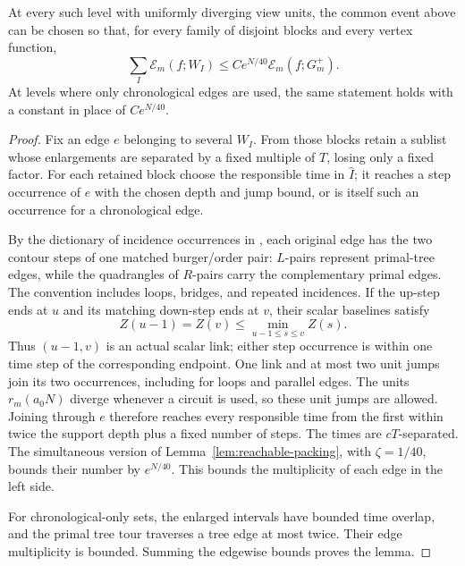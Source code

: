 \begin{lemma}
\label{lem:energy-overlap}
At every such level with uniformly diverging view units, the
common event above can be chosen so that, for every family of
disjoint blocks and every vertex function,
\begin{equation}
\label{eq:energy-overlap}
 \sum_I\mathcal E_m(f;W_I)
 \le C e^{N/40}\mathcal E_m(f;G_m^+).
\end{equation}
At levels where only chronological edges are used, the same
statement holds with a constant in place of \(Ce^{N/40}\).
\end{lemma}

\begin{proof}
Fix an edge \(e\) belonging to several \(W_I\).  From those
blocks retain a sublist whose enlargements are separated by a
fixed multiple of \(T\), losing only a fixed factor.  For each
retained block choose the responsible time in \(\widehat I\);
it reaches a step occurrence of \(e\) with the chosen depth and
jump bound, or is itself such an occurrence for a chronological
edge.

By the dictionary of incidence occurrences in
\cite[Proposition~3.1 and Lemma~3.2]{C}, each original edge has
the two contour steps of one matched burger/order pair:
\(L\)-pairs represent primal-tree edges, while the quadrangles
of \(R\)-pairs carry the complementary primal edges.  The
convention includes loops, bridges, and repeated incidences.  If the
up-step ends at \(u\) and its matching down-step ends at \(v\),
their scalar baselines satisfy
\[
 Z(u-1)=Z(v)\le \min_{u-1\le s\le v}Z(s).
\]
Thus \((u-1,v)\) is an actual scalar link; either step occurrence
is within one time step of the corresponding endpoint.
One link and at most two unit jumps join its two occurrences,
including for loops and parallel edges.  The units
\(r_m(a_0N)\) diverge whenever a circuit is used, so these unit
jumps are allowed.  Joining through \(e\) therefore reaches
every responsible time from the first within twice the
support depth plus a fixed number of steps.  The times are
\(cT\)-separated.  The simultaneous version of
Lemma~\ref{lem:reachable-packing}, with \(\zeta=1/40\), bounds
their number by \(e^{N/40}\).  This bounds the multiplicity
of each edge in the left side.

For chronological-only sets, the enlarged intervals have bounded
time overlap, and the primal tree tour traverses a tree edge at
most twice.  Their edge multiplicity is bounded.  Summing the
edgewise bounds proves the lemma.
\end{proof}

